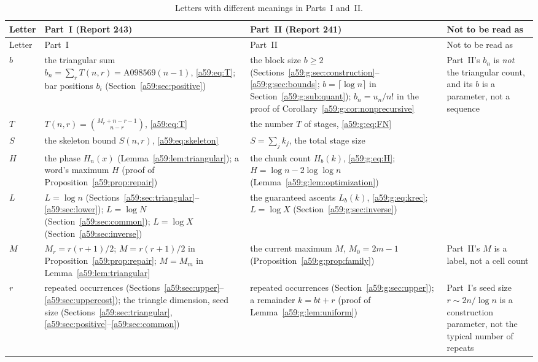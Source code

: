 \documentclass[11pt,letterpaper]{article}
\theoremstyle{remark}\newtheorem{remark}[theorem]{Remark}
\theoremstyle{remark}\newtheorem{wremark}{Remark}\renewcommand{\thewremark}{W\arabic{wremark}}
\theoremstyle{plain}\newtheorem{wcorollary}[wremark]{Corollary}
\begin{document}
\begin{small}
\begin{longtable}{@{}>{\raggedright\arraybackslash}p{}>{\raggedright\arraybackslash}p{}>{\raggedright\arraybackslash}p{}>{\raggedright\arraybackslash}p{}@{}}
\caption{Letters with different meanings in Parts~I and~II.}\label{a59:tab:notation}\\
\toprule
Letter & Part~I (Report 243) & Part~II (Report 241) & Not to be read as\\
\midrule
\endfirsthead
\toprule
Letter & Part~I & Part~II & Not to be read as\\
\midrule
\endhead
$b$ & the triangular sum $b_n=\sum_rT(n,r)=\mathrm{A098569}(n-1)$, \eqref{a59:eq:T}; bar positions $b_i$ (Section~\ref{a59:sec:positive}) & the block size $b\ge2$ (Sections~\ref{a59:g:sec:construction}--\ref{a59:g:sec:bounds}; $b=\lceil\log n\rceil$ in Section~\ref{a59:g:sub:quant}); $b_n=u_n/n!$ in the proof of Corollary~\ref{a59:g:cor:nonprecursive} & Part~II's $b_n$ is \emph{not} the triangular count, and its $b$ is a parameter, not a sequence\\
$T$ & $T(n,r)=\binom{M_r+n-r-1}{n-r}$, \eqref{a59:eq:T} & the number $T$ of stages, \eqref{a59:g:eq:FN} & \\
$S$ & the skeleton bound $S(n,r)$, \eqref{a59:eq:skeleton} & $S=\sum_jk_j$, the total stage size & \\
$H$ & the phase $H_n(x)$ (Lemma~\ref{a59:lem:triangular}); a word's maximum $H$ (proof of Proposition~\ref{a59:prop:repair}) & the chunk count $H_b(k)$, \eqref{a59:g:eq:H}; $H=\log n-2\log\log n$ (Lemma~\ref{a59:g:lem:optimization}) & \\
$L$ & $L=\log n$ (Sections~\ref{a59:sec:triangular}--\ref{a59:sec:lower}); $L=\log N$ (Section~\ref{a59:sec:common}); $L=\log X$ (Section~\ref{a59:sec:inverse}) & the guaranteed ascents $L_b(k)$, \eqref{a59:g:eq:krec}; $L=\log X$ (Section~\ref{a59:g:sec:inverse}) & \\
$M$ & $M_r=r(r+1)/2$; $M=r(r+1)/2$ in Proposition~\ref{a59:prop:repair}; $M=M_m$ in Lemma~\ref{a59:lem:triangular} & the current maximum $M$, $M_0=2m-1$ (Proposition~\ref{a59:g:prop:family}) & Part~II's $M$ is a label, not a cell count\\
$r$ & repeated occurrences (Sections~\ref{a59:sec:upper}--\ref{a59:sec:uppercost}); the triangle dimension, seed size (Sections~\ref{a59:sec:triangular}, \ref{a59:sec:positive}--\ref{a59:sec:common}) & repeated occurrences (Section~\ref{a59:g:sec:upper}); a remainder $k=bt+r$ (proof of Lemma~\ref{a59:g:lem:uniform}) & Part~I's seed size $r\sim2n/\log n$ is a construction parameter, not the typical number of repeats\\

\end{longtable}
\end{small}
\end{document}
